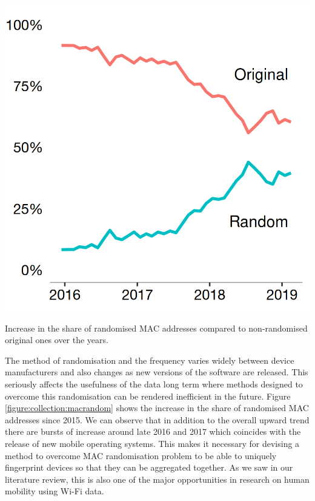 \begin{marginfigure}
  \forcerectofloat
  \includegraphics{images/mac-randomisation.png}
  \caption{Increase in the share of randomised MAC addresses compared to non-randomised original ones over the years.}
  \label{figure:collection:macrandom}
\end{marginfigure}

The method of randomisation and the frequency varies widely between device manufacturers and also changes as new versions of the software are released.
This seriously affects the usefulness of the data long term where methods designed to overcome this randomisation can be rendered inefficient in the future.
Figure \ref{figure:collection:macrandom} shows the increase in the share of randomised MAC addresses since 2015.
We can observe that in addition to the overall upward trend there are bursts of increase around late 2016 and 2017 which coincides with the release of new mobile operating systems.
This makes it necessary for devising a method to overcome MAC randomisation problem to be able to uniquely fingerprint devices so that they can be aggregated together.
As we saw in our literature review, this is also one of the major opportunities in research on human mobility using Wi-Fi data.

